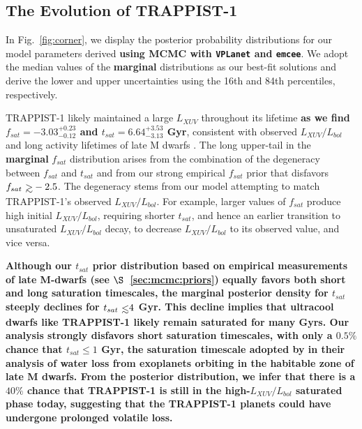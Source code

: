 \documentclass[twocolumn]{aastex62}
\def\gsim{~\rlap{$>$}{\lower 1.0ex\hbox{$\sim$}}}
\def\lsim{~\rlap{$<$}{\lower 1.0ex\hbox{$\sim$}}}
\newcommand{\xxx}[1]{{\textbf{#1}}}
\newcommand{\vplanet}[0]{\texttt{VPLanet}\xspace}
\newcommand{\emcee}[0]{\texttt{emcee}\xspace}
\begin{document}
\subsection{The Evolution of TRAPPIST-1}

In Fig.~\ref{fig:corner}, we display the posterior probability distributions for our model parameters derived \xxx{using MCMC with \vplanet and \emcee}. We adopt the median values of the \xxx{marginal} distributions as our best-fit solutions and derive the lower and upper uncertainties using the 16th and 84th percentiles, respectively. 

TRAPPIST-1 likely maintained a large $L_{XUV}$ throughout its lifetime \xxx{as we find $f_{sat} = -3.03^{+0.23}_{-0.12}$ and $t_{sat} = 6.64^{+3.53}_{-3.13}$ Gyr}, consistent with observed $L_{XUV}/L_{bol}$ and long activity lifetimes of late M dwarfs \citep{West2008,Wright2018}. The long upper-tail in the \xxx{marginal} $f_{sat}$ distribution arises from the combination of the degeneracy between $f_{sat}$ and $t_{sat}$ and from our strong empirical $f_{sat}$ prior that disfavors $f_{sat} \gsim -2.5$. The degeneracy stems from our model attempting to match TRAPPIST-1's observed \xxx{$L_{XUV}/L_{bol}$}. For example, larger values of $f_{sat}$ produce high initial \xxx{$L_{XUV}/L_{bol}$}, requiring shorter $t_{sat}$, and hence an earlier transition to unsaturated \xxx{$L_{XUV}/L_{bol}$} decay, to decrease \xxx{$L_{XUV}/L_{bol}$} to its observed value, and vice versa. 

\xxx{Although our $t_{sat}$ prior distribution based on empirical measurements of late M-dwarfs (see $\S$~\ref{sec:mcmc:priors}) equally favors both short and long saturation timescales, the marginal posterior density for $t_{sat}$ steeply declines for $t_{sat} \lsim 4$ Gyr. This decline implies that ultracool dwarfs like TRAPPIST-1 likely remain saturated for many Gyrs. Our analysis strongly disfavors short saturation timescales, with only a $0.5\%$ chance that $t_{sat} \leq 1$ Gyr, the saturation timescale adopted by \citet{Luger2015} in their analysis of water loss from exoplanets orbiting in the habitable zone of late M dwarfs. From the posterior distribution, we infer that there is a $40\%$ chance that TRAPPIST-1 is still in the high-$L_{XUV}/L_{bol}$ saturated phase today, suggesting that the TRAPPIST-1 planets could have undergone prolonged volatile loss.}
\end{document}
